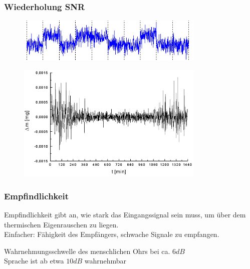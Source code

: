 \begin{frame}
  \frametitle{Wiederholung SNR}

  \begin{center}
    \begin{figure}
      \includegraphics[width=0.8\textwidth,height=.25\textheight,keepaspectratio]{a18/Received_message.jpg}
    \end{figure}
  \end{center}

  \begin{center}
    \begin{figure}
      \includegraphics[width=0.8\textwidth,height=.35\textheight,keepaspectratio]{a18/Analyse_thermo_gravimetrique_bruit.png}
    \end{figure}
  \end{center}

\end{frame}

\begin{frame}
  \frametitle{Empfindlichkeit}

  Empfindlichkeit gibt an, wie stark das Eingangssignal sein muss, um über
  dem thermischen Eigenrauschen zu liegen.\\[.5em]

  Einfacher: Fähigkeit des Empfängers, schwache Signale zu empfangen.

  \bigskip

  Wahrnehmungsschwelle des menschlichen Ohrs bei ca. $6 dB$\\
  Sprache ist ab etwa $10 dB$ wahrnehmbar

\end{frame}

